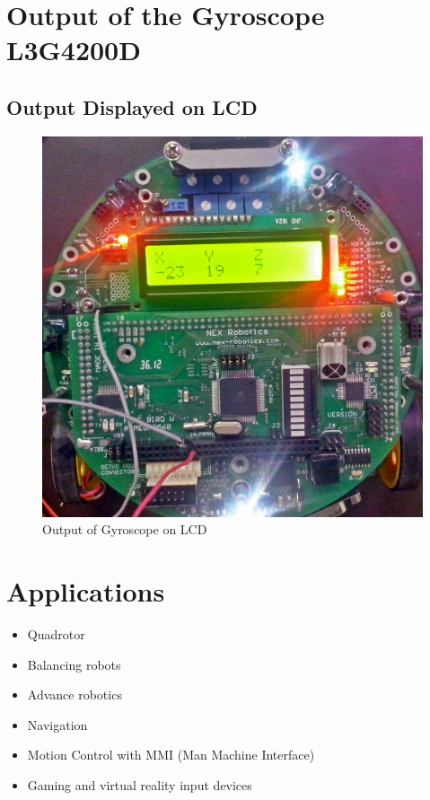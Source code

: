 \documentclass[a4paper,12 pt]{article}
\begin{document}
\section{Output of the Gyroscope L3G4200D}
\subsection{Output Displayed on LCD}
\begin{figure}[!h]
\begin{center}
 \includegraphics[scale=0.40]{CAM00213.jpg}
\end{center}
\caption{Output of Gyroscope on LCD}
\label{fig:1}
\end{figure}



\section{Applications}
\begin{itemize}
\item Quadrotor
\item Balancing robots
\item  Advance robotics
\item Navigation 
\item Motion Control with MMI (Man Machine Interface)
\item Gaming and virtual reality input devices
\end{itemize}
\end{document}
